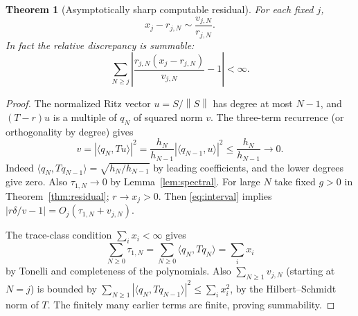 \documentclass[11pt]{article}
\newtheorem{theorem}{Theorem}[section]
\theoremstyle{remark}\newtheorem{remark}[theorem]{Remark}
\newcommand{\norm}[1]{\left\lVert#1\right\rVert}
\begin{document}
\begin{theorem}[Asymptotically sharp computable residual]\label{thm:sharp}
For each fixed $j$,
\begin{equation}\label{eq:sharp}
 \boxed{x_j-r_{j,N}\sim \frac{v_{j,N}}{r_{j,N}}.}
\end{equation}
In fact the relative discrepancy is summable:
\[
 \sum_{N\ge j}\left|\frac{r_{j,N}(x_j-r_{j,N})}{v_{j,N}}-1\right|<\infty.
\]
\end{theorem}
\begin{proof}
The normalized Ritz vector $u=S/\norm{S}$ has degree at most $N-1$, and $(T-r)u$ is a multiple of $q_N$ of squared norm $v$. The three-term recurrence (or orthogonality by degree) gives
\[
 v=\left|\langle q_N,Tu\rangle\right|^2
 =\frac{h_N}{h_{N-1}}\left|\langle q_{N-1},u\rangle\right|^2
 \le \frac{h_N}{h_{N-1}}\to0.
\]
Indeed $\langle q_N,Tq_{N-1}\rangle=\sqrt{h_N/h_{N-1}}$ by leading coefficients, and the lower degrees give zero. Also $\tau_{1,N}\to0$ by Lemma~\ref{lem:spectral}. For large $N$ take fixed $g>0$ in Theorem~\ref{thm:residual}; $r\to x_j>0$. Then \eqref{eq:interval} implies $|r\delta/v-1|=O_j(\tau_{1,N}+v_{j,N})$.

The trace-class condition $\sum_i x_i<\infty$ gives
\[
 \sum_{N\ge0}\tau_{1,N}=\sum_{N\ge0}\langle q_N,Tq_N\rangle=\sum_i x_i
\]
by Tonelli and completeness of the polynomials. Also $\sum_{N\ge1}v_{j,N}$ (starting at $N=j$) is bounded by $\sum_{N\ge1}|\langle q_N,Tq_{N-1}\rangle|^2\le \sum_i x_i^2$, by the Hilbert--Schmidt norm of $T$. The finitely many earlier terms are finite, proving summability.
\end{proof}
\end{document}
